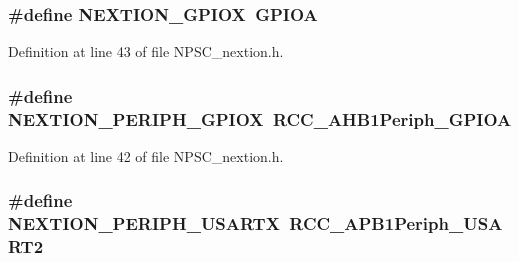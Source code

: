 \subsubsection[{\texorpdfstring{N\+E\+X\+T\+I\+O\+N\+\_\+\+G\+P\+I\+OX}{NEXTION_GPIOX}}]{\setlength{\rightskip}{0pt plus 5cm}\#define N\+E\+X\+T\+I\+O\+N\+\_\+\+G\+P\+I\+OX~G\+P\+I\+OA}\hypertarget{group__nextion___constants_gab6c406ec72b8a3e97f1808c45b638af0}{}\label{group__nextion___constants_gab6c406ec72b8a3e97f1808c45b638af0}


Definition at line 43 of file N\+P\+S\+C\+\_\+nextion.\+h.

\subsubsection[{\texorpdfstring{N\+E\+X\+T\+I\+O\+N\+\_\+\+P\+E\+R\+I\+P\+H\+\_\+\+G\+P\+I\+OX}{NEXTION_PERIPH_GPIOX}}]{\setlength{\rightskip}{0pt plus 5cm}\#define N\+E\+X\+T\+I\+O\+N\+\_\+\+P\+E\+R\+I\+P\+H\+\_\+\+G\+P\+I\+OX~R\+C\+C\+\_\+\+A\+H\+B1\+Periph\+\_\+\+G\+P\+I\+OA}\hypertarget{group__nextion___constants_ga0196543a58aaa665478912e81c89d98a}{}\label{group__nextion___constants_ga0196543a58aaa665478912e81c89d98a}


Definition at line 42 of file N\+P\+S\+C\+\_\+nextion.\+h.

\subsubsection[{\texorpdfstring{N\+E\+X\+T\+I\+O\+N\+\_\+\+P\+E\+R\+I\+P\+H\+\_\+\+U\+S\+A\+R\+TX}{NEXTION_PERIPH_USARTX}}]{\setlength{\rightskip}{0pt plus 5cm}\#define N\+E\+X\+T\+I\+O\+N\+\_\+\+P\+E\+R\+I\+P\+H\+\_\+\+U\+S\+A\+R\+TX~R\+C\+C\+\_\+\+A\+P\+B1\+Periph\+\_\+\+U\+S\+A\+R\+T2}\hypertarget{group__nextion___constants_ga523f9520cea00f41b66c2b01fc0865e6}{}\label{group__nextion___constants_ga523f9520cea00f41b66c2b01fc0865e6}


